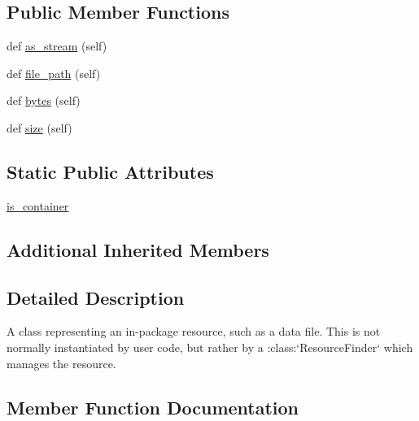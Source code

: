 \subsection*{Public Member Functions}
\begin{DoxyCompactItemize}
\item 
def \hyperlink{classpip_1_1__vendor_1_1distlib_1_1resources_1_1Resource_a7eca91a0a970083732db80544bd7dae9}{as\+\_\+stream} (self)
\item 
def \hyperlink{classpip_1_1__vendor_1_1distlib_1_1resources_1_1Resource_af1228f4c193f5b7cc5d13ea263c33579}{file\+\_\+path} (self)
\item 
def \hyperlink{classpip_1_1__vendor_1_1distlib_1_1resources_1_1Resource_a8f0a169e5ebe70150e18c00348983395}{bytes} (self)
\item 
def \hyperlink{classpip_1_1__vendor_1_1distlib_1_1resources_1_1Resource_a3b6a99b194454ce8c36f3eed2c09b137}{size} (self)
\end{DoxyCompactItemize}
\subsection*{Static Public Attributes}
\begin{DoxyCompactItemize}
\item 
\hyperlink{classpip_1_1__vendor_1_1distlib_1_1resources_1_1Resource_a2dc10975bf53ccb04aa89e840302166d}{is\+\_\+container}
\end{DoxyCompactItemize}
\subsection*{Additional Inherited Members}


\subsection{Detailed Description}
\begin{DoxyVerb}A class representing an in-package resource, such as a data file. This is
not normally instantiated by user code, but rather by a
:class:`ResourceFinder` which manages the resource.
\end{DoxyVerb}
 

\subsection{Member Function Documentation}
\mbox{\label{classpip_1_1__vendor_1_1distlib_1_1resources_1_1Resource_a7eca91a0a970083732db80544bd7dae9}} 

